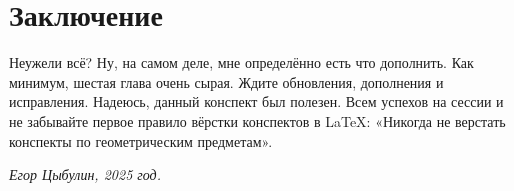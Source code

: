 \section{Заключение}
Неужели всё? Ну, на самом деле, мне определённо есть что дополнить. Как минимум, шестая глава очень сырая. Ждите обновления, дополнения и исправления. Надеюсь, данный конспект был полезен. Всем успехов на сессии и не забывайте первое правило вёрстки конспектов в \LaTeX: «Никогда не верстать конспекты по геометрическим предметам».
\begin{flushright}
    \textit{Егор Цыбулин, 2025 год.}
\end{flushright}